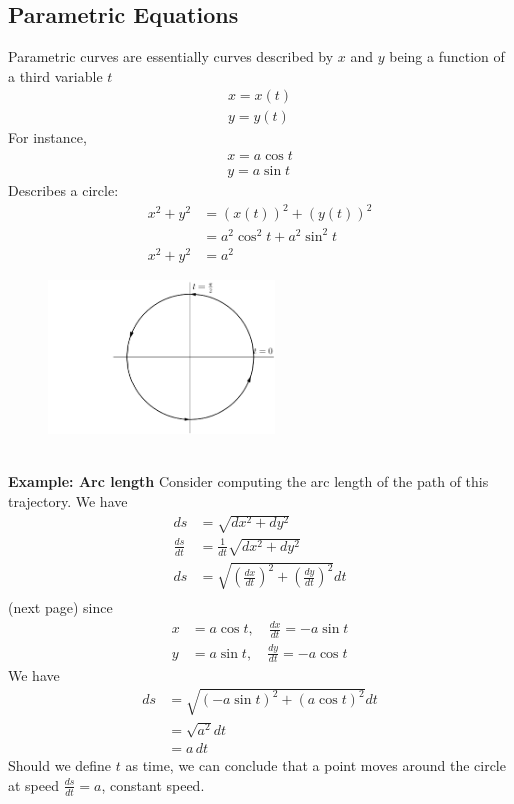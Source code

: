\documentclass{report}
\begin{document}
\subsection{Parametric Equations} %
Parametric curves are essentially curves described by $x$ and $y$ being a function of a third 
variable $t$
\begin{align*}
x=x(t)\\
y=y(t)
\end{align*}
For instance, 
\begin{align*}
x=a\cos t\\
y=a\sin t
\end{align*}
Describes a circle:
\begin{align*}
x^2+y^2&=(x(t))^2+(y(t))^2\\
&=a^2\cos^2t+a^2\sin^2t\\
x^2+y^2&=a^2
\end{align*}
\begin{figure}[h]
\includegraphics[width=6cm]{Capture48}\\
\centering
{}
\end{figure}\\
\textbf{Example: Arc length}
Consider computing the arc length of the path of this trajectory. We have
\begin{align*}
ds&=\sqrt{dx^2+dy^2}\\
\frac{ds}{dt}&=\frac{1}{dt}\sqrt{dx^2+dy^2}\\
ds&=\sqrt{\left(\frac{dx}{dt}\right)^2+\left(\frac{dy}{dt}\right)^2}dt\\
\end{align*}
(next page)
\newpage
\noindent since
\begin{align*}
x&=a\cos t,\quad\frac{dx}{dt}=-a\sin t\\
y&=a\sin t,\quad\frac{dy}{dt}=-a\cos t
\end{align*}
We have
\begin{align*}
ds&=\sqrt{(-a\sin t)^2+(a\cos t)^2}dt\\
&=\sqrt{a^2}dt\\
&=a\,dt
\end{align*}
Should we define $t$ as time, we can conclude that a point moves
around the circle at speed $\frac{ds}{dt}=a$, constant speed.
\newpage
\end{document}
